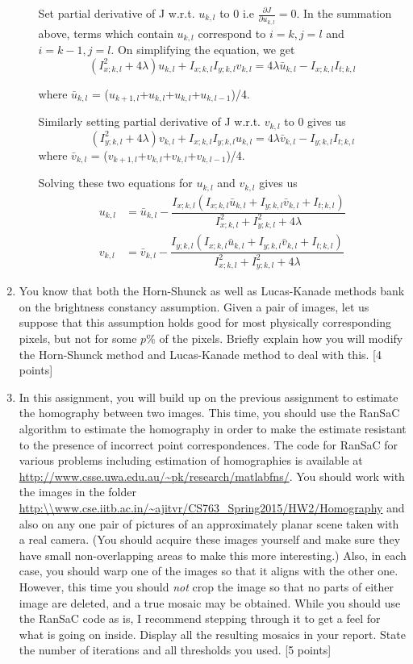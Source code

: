 \documentclass[11pt]{article}
\begin{document}
\begin{enumerate}
\begin{itemize}
Set partial derivative of J w.r.t. $u_{k,l}$ to 0 i.e $\frac{\partial J}{\partial u_{k,l}} = 0$.
In the summation above, terms which contain $u_{k,l}$ correspond to $i=k,j=l$ and $i=k-1,j=l$. On simplifying the equation, we get
\[
(I_{x;k,l}^2 + 4 \lambda) u_{k,l} + I_{x;k,l} I_{y;k,l} v_{k,l} = 4 \lambda \bar{u}_{k,l} - I_{x;k,l} I_{t;k,l}
\]

where $\bar{u}_{k,l}$ = (${u}_{k+1,l}$+${u}_{k,l}$+${u}_{k,l}$+${u}_{k,l-1}$)/4. 

Similarly setting partial derivative of J w.r.t. $v_{k,l}$ to 0 gives us
 \[
 (I_{y;k,l}^2 + 4 \lambda) v_{k,l} + I_{x;k,l} I_{y;k,l} u_{k,l} = 4 \lambda \bar{v}_{k,l} - I_{y;k,l} I_{t;k,l}
\] 
where $\bar{v}_{k,l}$ = (${v}_{k+1,l}$+${v}_{k,l}$+${v}_{k,l}$+${v}_{k,l-1}$)/4.

Solving these two equations for ${u}_{k,l}$ and ${v}_{k,l}$ gives us
\begin{align}
u_{k,l} &= \bar{u}_{k,l} - \dfrac{I_{x;k,l} (I_{x;k,l} \bar{u}_{k,l} + I_{y;k,l} \bar{v}_{k,l} + I_{t;k,l})}{I^2_{x;k,l} + I^2_{y;k,l} + 4 \lambda} \\
v_{k,l} &= \bar{v}_{k,l} - \dfrac{I_{y;k,l} (I_{x;k,l} \bar{u}_{k,l} + I_{y;k,l} \bar{v}_{k,l} + I_{t;k,l})}{I^2_{x;k,l} + I^2_{y;k,l} + 4 \lambda}
\end{align}

\end{itemize}

\item You know that both the Horn-Shunck as well as Lucas-Kanade methods bank on the brightness constancy assumption. Given a pair of images, let us suppose that this assumption holds good for most physically corresponding pixels, but not for some $p \%$ of the pixels. Briefly explain how you will modify the Horn-Shunck method and Lucas-Kanade method to deal with this. \textsf{[4 points]}

\item In this assignment, you will build up on the previous assignment to estimate the homography between two images. This time, you should use the RanSaC algorithm to estimate the homography in order to make the estimate resistant to the presence of incorrect point correspondences. The code for RanSaC for various problems including estimation of homographies is available at \url{http://www.csse.uwa.edu.au/~pk/research/matlabfns/}. You should work with the images in the folder \url{http:\\www.cse.iitb.ac.in/~ajitvr/CS763_Spring2015/HW2/Homography} and also on any one pair of pictures of an approximately planar scene taken with a real camera. (You should acquire these images yourself and make sure they have small non-overlapping areas to make this more interesting.) Also, in each case, you should warp one of the images so that it aligns with the other one. However, this time you should \emph{not} crop the image so that no parts of either image are deleted, and a true mosaic may be obtained. While you should use the RanSaC code as is, I recommend stepping through it to get a feel for what is going on inside. Display all the resulting mosaics in your report. State the number of iterations and all thresholds you used. \textsf{[5 points]}


\end{enumerate}
\end{document}
